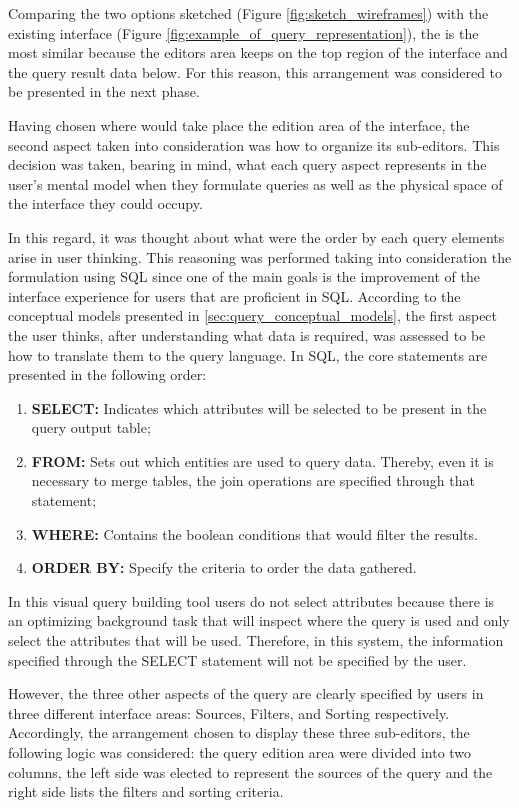 Comparing the two options sketched (Figure \ref{fig:sketch_wireframes}) with the existing interface (Figure \ref{fig:example_of_query_representation}), the  is the most similar because the editors area keeps on the top region of the interface and the query result data below. For this reason, this arrangement was considered to be presented in the next phase.

Having chosen where would take place the edition area of the interface, the second aspect taken into consideration was how to organize its sub-editors. This decision was taken, bearing in mind, what each query aspect represents in the user's mental model when they formulate queries as well as the physical space of the interface they could occupy.

In this regard, it was thought about what were the order by each query elements arise in user thinking. This reasoning was performed taking into consideration the formulation using \gls{SQL} since one of the main goals is the improvement of the interface experience for users that are proficient in \gls{SQL}. According to the conceptual models presented in \ref{sec:query_conceptual_models}, the first aspect the user thinks, after understanding what data is required, was assessed to be how to translate them to the query language. In \gls{SQL}, the core statements are presented in the following order:

\begin{enumerate}
  \item \textbf{SELECT: }Indicates which attributes will be selected to be present in the query output table;
  \item \textbf{FROM: }Sets out which entities are used to query data. Thereby, even it is necessary to merge tables, the join operations are specified through that statement;
  \item \textbf{WHERE: }Contains the boolean conditions that would filter the results.
  \item \textbf{ORDER BY: }Specify the criteria to order the data gathered.
\end{enumerate}

In this visual query building tool users do not select attributes because there is an optimizing background task that will inspect where the query is used and only select the attributes that will be used. Therefore, in this system, the information specified through the SELECT statement will not be specified by the user.

However, the three other aspects of the query are clearly specified by users in three different interface areas: Sources, Filters, and Sorting respectively. Accordingly, the arrangement chosen to display these three sub-editors, the following logic was considered: the query edition area were divided into two columns, the left side was elected to represent the sources of the query and the right side lists the filters and sorting criteria.

